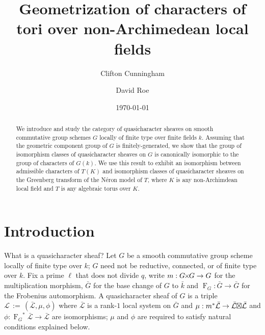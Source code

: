 \documentclass[11pt]{amsart}
\title[Geometrization of characters of tori]{Geometrization of characters of tori over non-Archimedean local fields}
\date{\today}
\author{Clifton Cunningham}
\author{David Roe}
\theoremstyle{plain}
\theoremstyle{definition}
\theoremstyle{remark}
\newcommand{\bFq}{\bar{k}}
\newcommand{\Fq}{k}
\newcommand{\Frob}[1]{{\operatorname{F}_{#1}}}
\newcommand{\ceq}{{\, :=\, }}
\newcommand{\cs}[1]{{\mathcal{#1}}}
\newcommand{\gcs}[1]{{\mathcal{\bar #1}}}
\newcommand{\bG}{\bar{G}}
\newcommand{\tight}[3]{\hspace{-#1pt}{#2}\hspace{-#3pt}}
\newcommand{\GxG}{\text{$G \tight{1}{\times}{1} G$}}
\newcommand{\LxL}{\text{$\gcs{L} \tight{0}{\boxtimes}{0} \gcs{L}$}}
\begin{document}
\begin{abstract}
  We introduce and study the category of quasicharacter sheaves on smooth commutative
  group schemes $G$ locally of finite type over finite fields
  $\Fq$. Assuming that the geometric component group of $G$
  is finitely-generated, we show that the group of isomorphism classes
  of quasicharacter sheaves on $G$ is canonically isomorphic to the group
  of characters of $G(\Fq)$. We use this result to exhibit an
  isomorphism between admissible characters of $T(K)$ and isomorphism
  classes of quasicharacter sheaves on the Greenberg transform of the Néron
  model of $T$, where $K$ is any non-Archimdean local field and $T$ is
  any algebraic torus over $K$.
\end{abstract}

\maketitle

\section*{Introduction}

%
What is a quasicharacter sheaf?
Let $G$ be a smooth commutative group scheme locally of finite
type over $\Fq$; $G$ need not be reductive, connected, or of
finite type over $\Fq$. Fix a prime $\ell$ that does not divide
$q$, write $m : \GxG \to G$ for the multiplication morphism,
$\bG$ for the base change of $G$ to $\bFq$ and
$\Frob{G} : \bG \to \bG$ for the Frobenius automorphism.
A quasicharacter sheaf of $G$ is a triple $\cs{L}\ceq
(\gcs{L},\mu,\phi)$ where $\gcs{L}$ is a rank-$1$ local system on $\bG$ and $\mu: m^*
\gcs{L} \to \LxL$ and $\phi : \Frob{G}^*\gcs{L} \to \gcs{L}$ are isomorphisms;
$\mu$ and $\phi$ are required to satisfy natural conditions explained below.
\end{document}
